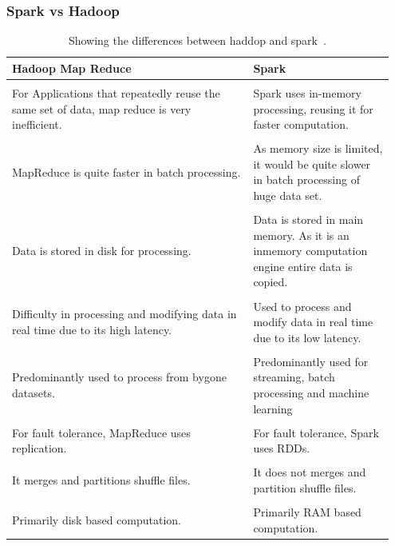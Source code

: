 \documentclass{report}
\begin{document}
\subsubsection{Spark vs Hadoop}

\begin{table}[h!]
    \begin{center}
    \label{tab:Amino acids}
        \begin{tabular}{p{0.6\linewidth}|p{0.35\linewidth}}
        Hadoop Map Reduce & Spark\\
        \hline
        \\
        For Applications that repeatedly reuse the same set of data, map reduce is very inefficient. & Spark uses in-memory processing, reusing it for faster computation.
        \\
        \hline
        \\
        MapReduce is quite faster in batch processing. & As memory size is limited, it would be quite slower in batch processing of huge data set.
        \\
        \hline
        \\
        Data is stored in disk for processing. & Data is stored in main memory. As it is an inmemory computation engine entire data is copied. 
        \\
        \hline
        \\
        Difficulty in processing and modifying data in real time due to its high latency. & Used to process and modify data in real time due to its low latency. 
        \\
        \hline
        \\
        Predominantly used to process from bygone datasets. & Predominantly used for streaming, batch processing and machine learning
        \\
        \hline
        \\
        For fault tolerance, MapReduce uses replication. & For fault tolerance, Spark uses RDDs.
        \\
        \hline
        \\
        It merges and partitions shuffle files. & It does not merges and partition shuffle files. 
        \\
        \hline
        \\
        Primarily disk based computation. & Primarily RAM based computation.
        \\
        \end{tabular}
        \caption{\label{hadoopvsspark}Showing the differences between haddop and spark~\cite{hazarika_performance_2017}.}
    \end{center}
\end{table}
\end{document}
